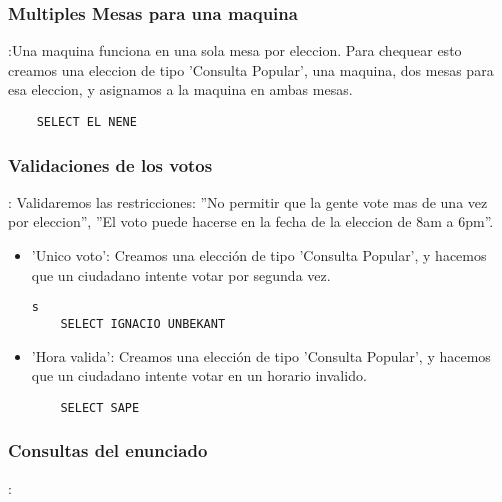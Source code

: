 \subsubsection{Multiples Mesas para una maquina}:Una maquina funciona en una sola mesa por eleccion. Para chequear esto creamos una eleccion de tipo 'Consulta Popular', una maquina, dos mesas para esa eleccion, y asignamos a la maquina en ambas mesas.
	\begin{lstlisting}
	SELECT EL NENE
	\end{lstlisting}
	
\subsubsection{Validaciones de los votos}: Validaremos las restricciones: ''No permitir que la gente vote mas de una vez por eleccion'', ''El voto puede hacerse en la fecha de la eleccion de 8am a 6pm''. 
	\begin{itemize}
	\item 'Unico voto': Creamos una elección de tipo 'Consulta Popular', y hacemos que un ciudadano intente votar por segunda vez.
	\begin{lstlisting}s
	SELECT IGNACIO UNBEKANT
	\end{lstlisting}
	
	\item 'Hora valida': Creamos una elección de tipo 'Consulta Popular', y hacemos que un ciudadano 		intente votar en un horario invalido.
	\begin{lstlisting}
	SELECT SAPE
	\end{lstlisting}	
	
	\end{itemize}					

\subsubsection{Consultas del enunciado}:



